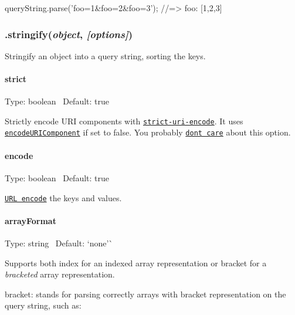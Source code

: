 \begin{DoxyCode}
queryString.parse('foo=1&foo=2&foo=3');
//=> foo: [1,2,3]
\end{DoxyCode}


\subsubsection*{.stringify({\itshape object}, {\itshape \mbox{[}options\mbox{]}})}

Stringify an object into a query string, sorting the keys.

\paragraph*{strict}

Type\+: {\ttfamily boolean}~\newline
 Default\+: {\ttfamily true}

Strictly encode U\+RI components with \href{https://github.com/kevva/strict-uri-encode}{\tt strict-\/uri-\/encode}. It uses \href{https://developer.mozilla.org/en/docs/Web/JavaScript/Reference/Global_Objects/encodeURIComponent}{\tt encode\+U\+R\+I\+Component} if set to false. You probably \href{https://github.com/sindresorhus/query-string/issues/42}{\tt don\textquotesingle{}t care} about this option.

\paragraph*{encode}

Type\+: {\ttfamily boolean}~\newline
 Default\+: {\ttfamily true}

\href{https://developer.mozilla.org/en/docs/Web/JavaScript/Reference/Global_Objects/encodeURIComponent}{\tt U\+RL encode} the keys and values.

\paragraph*{array\+Format}

Type\+: {\ttfamily string}~\newline
 Default\+: `\textquotesingle{}none'\`{}

Supports both {\ttfamily index} for an indexed array representation or {\ttfamily bracket} for a {\itshape bracketed} array representation.


\begin{DoxyItemize}
\item {\ttfamily bracket}\+: stands for parsing correctly arrays with bracket representation on the query string, such as\+:
\end{DoxyItemize}


